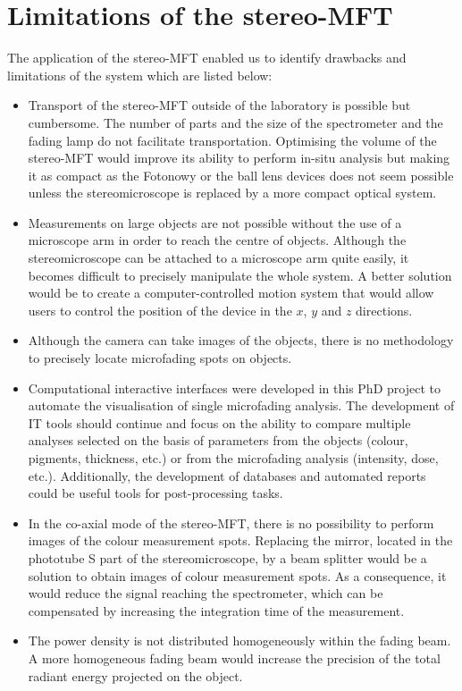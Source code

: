 \section{Limitations of the stereo-MFT}


The application of the stereo-MFT enabled us to identify drawbacks and limitations of the system which are listed below:

\begin{itemize}

\item Transport of the stereo-MFT outside of the laboratory is possible but cumbersome. The number of parts and the size of the spectrometer and the fading lamp do not facilitate transportation. Optimising the volume of the stereo-MFT would improve its ability to perform in-situ analysis but making it as compact as the Fotonowy or the ball lens devices does not seem possible unless the stereomicroscope is replaced by a more compact optical system.

\item Measurements on large objects are not possible without the use of a microscope arm in order to reach the centre of objects. Although the stereomicroscope can be attached to a microscope arm quite easily, it becomes difficult to precisely manipulate the whole system. A better solution would be to create a computer-controlled motion system that would allow users to control the position of the device in the $x$, $y$ and $z$ directions. 

\item Although the camera can take images of the objects, there is no methodology to precisely locate microfading spots on objects. 

\item Computational interactive interfaces were developed in this PhD project to automate the visualisation of single microfading analysis. The development of IT tools should continue and focus on the ability to compare multiple analyses selected on the basis of parameters from the objects (colour, pigments, thickness, etc.) or from the microfading analysis (intensity, dose, etc.). Additionally, the development of databases and automated reports could be useful tools for post-processing tasks.

\item In the co-axial mode of the stereo-MFT, there is no possibility to perform images of the colour measurement spots. Replacing the mirror, located in the phototube S part of the stereomicroscope, by a beam splitter would be a solution to obtain images of colour measurement spots. As a consequence, it would reduce the signal reaching the spectrometer, which can be compensated by increasing the integration time of the measurement.

\item The power density is not distributed homogeneously within the fading beam. A more homogeneous fading beam would increase the precision of the total radiant energy projected on the object.

\end{itemize}